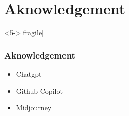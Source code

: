 \documentclass[9pt,table,xcolor=dvipsnames]{beamer}%
\theoremstyle{definition}
\theoremstyle{plain}
\begin{document}
\section{Aknowledgement}
\begin{frame}<5->[fragile] %
  \frametitle{Aknowledgement}

  \begin{center}
    \begin{minipage}{0.4 \textwidth}
      \Large
      \begin{itemize}
        \item Chatgpt
        \item Github Copilot
        \item Midjourney
      \end{itemize}
    \end{minipage}
  \end{center}


\end{frame}
\end{document}
